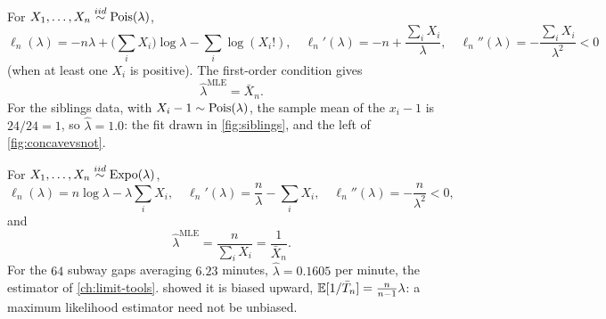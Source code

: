 \begin{worked}
For $X_1, \ldots, X_n \stackrel{iid}{\sim} \text{Pois}(\lambda)$,
\[
\ell_n(\lambda) = -n\lambda + \Big(\sum_i X_i\Big)\log\lambda - \sum_i \log(X_i!), \quad \ell_n'(\lambda) = -n + \frac{\sum_i X_i}{\lambda}, \quad \ell_n''(\lambda) = -\frac{\sum_i X_i}{\lambda^2} < 0
\]
(when at least one $X_i$ is positive).
The first-order condition gives
\[
\hat{\lambda}^{\text{MLE}} = \bar{X}_n.
\]
For the siblings data, with $X_i - 1 \sim \text{Pois}(\lambda)$, the sample mean of the $x_i - 1$ is $24/24 = 1$, so $\hat{\lambda} = 1.0$: the fit drawn in \cref{fig:siblings}, and the left of \cref{fig:concavevsnot}.
\end{worked}

\begin{worked}
For $X_1, \ldots, X_n \stackrel{iid}{\sim} \text{Expo}(\lambda)$,
\[
\ell_n(\lambda) = n\log\lambda - \lambda\sum_i X_i, \quad \ell_n'(\lambda) = \frac{n}{\lambda} - \sum_i X_i, \quad \ell_n''(\lambda) = -\frac{n}{\lambda^2} < 0,
\]
and
\[
\hat{\lambda}^{\text{MLE}} = \frac{n}{\sum_i X_i} = \frac{1}{\bar{X}_n}.
\]
For the $64$ subway gaps averaging $6.23$ minutes, $\hat{\lambda} = 0.1605$ per minute, the estimator of \cref{ch:limit-tools}.
 showed it is biased upward, $\operatorname*{\mathbb{E}}[1/\bar{T}_n] = \frac{n}{n-1}\lambda$: a maximum likelihood estimator need not be unbiased.
\end{worked}


